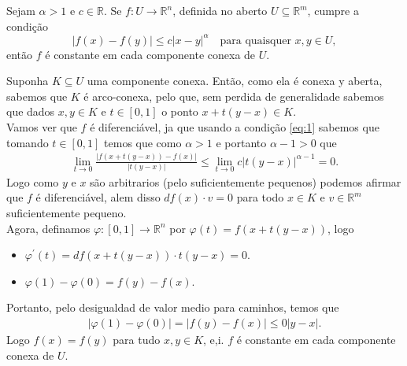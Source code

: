 \begin{homeworkProblem}[Seção 1-1]
  Sejam $\alpha > 1$ e $c \in \mathbb{R}$. Se $f : U \to \mathbb{R}^n$, definida no aberto $U \subseteq \mathbb{R}^m$, cumpre a condição
  \begin{equation}\label{eq:1}
    |f(x)-f(y)| \leq c|x-y|^\alpha \quad \text{para quaisquer } x,y \in U,   
  \end{equation}
  então $f$ é constante em cada componente conexa de $U$.
  \begin{solution}
    Suponha $K\subseteq U$ uma componente conexa. Então, como ela é conexa y aberta, sabemos que $K$ é arco-conexa, pelo que, sem perdida de generalidade sabemos que dados $x,y\in K$ e $t\in[0,1]$ o ponto $x+t(y-x)\in K$.\\
    Vamos ver que $f$ é diferenciável, ja que usando a condição \eqref{eq:1} sabemos que tomando $t\in[0,1]$ temos que como $\alpha>1$ e portanto $\alpha-1>0$ que 
    \begin{align*}
      \lim_{t \to 0}\frac{|f(x+t(y-x))-f(x)|}{|t(y-x)|}\leq \lim_{t \to 0}c|t(y-x)|^{\alpha-1}=0.
    \end{align*}
    Logo como $y$ e $x$ são arbitrarios (pelo suficientemente pequenos) podemos afirmar que $f$ é diferenciável, alem disso $df(x)\cdot v=0$ para todo $x\in K$ e $v\in \mathbb{R}^{m}$ suficientemente pequeno.\\
    Agora, definamos $\varphi:[0,1]\to\mathbb{R}^{n}$ por $\varphi(t)=f(x+t(y-x))$, logo
    \begin{itemize}
      \item $\varphi^{\prime}(t)=df(x+t(y-x))\cdot t(y-x)=0$.
      \item $\varphi(1)-\varphi(0)=f(y)-f(x)$.
    \end{itemize}
    Portanto, pelo desigualdad de valor medio para caminhos, temos que
    \begin{align*}
      |\varphi(1)-\varphi(0)|=|f(y)-f(x)|\leq 0|y-x|.
    \end{align*}
    Logo $f(x)=f(y)$ para tudo $x,y\in K$, e,i. $f$ é constante em cada componente conexa de $U$. 
  \end{solution}
\end{homeworkProblem}
